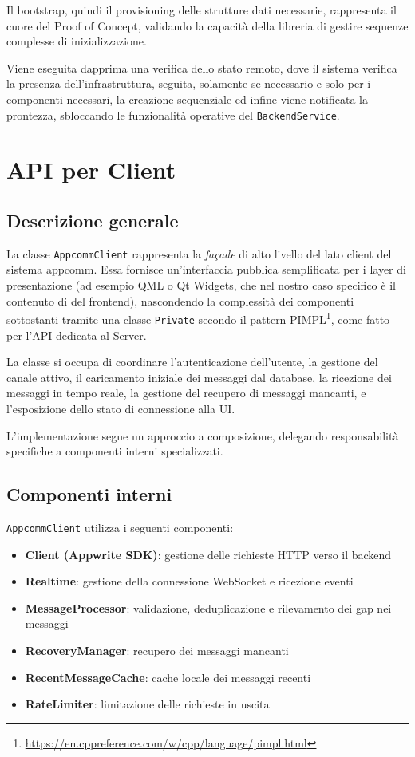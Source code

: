 \documentclass[a4paper, 11pt, twoside]{report}
\begin{document}
Il bootstrap, quindi il provisioning delle strutture dati necessarie, rappresenta il cuore del Proof of Concept, validando la
capacità della libreria di gestire sequenze complesse di inizializzazione.

\noindent Viene eseguita dapprima una verifica dello stato remoto, dove il sistema verifica la presenza dell'infrastruttura, seguita,
solamente se necessario e solo per i componenti necessari, la creazione sequenziale ed infine viene notificata la prontezza,
sbloccando le funzionalità operative del \texttt{BackendService}.

\section{API per Client}

\subsection{Descrizione generale}

La classe \texttt{AppcommClient} rappresenta la \textit{façade} di alto livello del lato client del sistema appcomm.  
Essa fornisce un'interfaccia pubblica semplificata per i layer di presentazione (ad esempio QML o Qt Widgets, che nel nostro caso specifico è il contenuto di del frontend), nascondendo la complessità dei componenti sottostanti tramite una classe \texttt{Private} secondo il pattern PIMPL\footnote{\url{https://en.cppreference.com/w/cpp/language/pimpl.html}}, come fatto per l'API dedicata al Server.

\noindent La classe si occupa di coordinare l'autenticazione dell'utente, la gestione del canale attivo, il caricamento iniziale dei
messaggi dal database, la ricezione dei messaggi in tempo reale, la gestione del recupero di messaggi mancanti, e l'esposizione dello
stato di connessione alla UI.

\noindent L’implementazione segue un approccio a composizione, delegando responsabilità specifiche a componenti interni specializzati.

\subsection{Componenti interni}

\texttt{AppcommClient} utilizza i seguenti componenti:

\begin{itemize}
    \item \textbf{Client (Appwrite SDK)}: gestione delle richieste HTTP verso il backend
    \item \textbf{Realtime}: gestione della connessione WebSocket e ricezione eventi
    \item \textbf{MessageProcessor}: validazione, deduplicazione e rilevamento dei gap nei messaggi
    \item \textbf{RecoveryManager}: recupero dei messaggi mancanti
    \item \textbf{RecentMessageCache}: cache locale dei messaggi recenti
    \item \textbf{RateLimiter}: limitazione delle richieste in uscita
\end{itemize}
\end{document}

